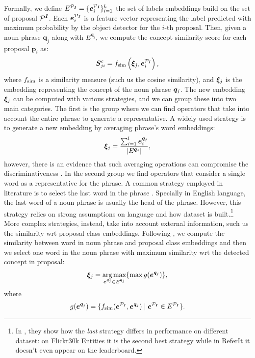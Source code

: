 Formally, we define $E^{\mathcal{P}_{\bm{I}}} = \{\bm{e}^{\mathcal{P}_{\bm{I}}}_i \}^{k}_{i=1}$ the set of labels
embeddings build on the set of proposal $\mathcal{P}^{\bm{I}}$. Each
$\bm{e}^{\mathcal{P}_{\bm{I}}}_i$ is a feature vector representing the label predicted with
maximum probability by the object detector for the $i$-th proposal.
Then, given a noun phrase $\bm{q}_j$ along with $E^{\bm{q}_j}$, we
compute the concept similarity score for each proposal $\bm{p}_i$ as:
\begin{equation}
  \bm{S}^c_{ji} = f_{\text{sim}} \left( \bm{\xi}_j, \bm{e}^{\mathcal{P}_{\bm{I}}}_i \right),
\end{equation}
where $f_{\text{sim}}$ is a similarity measure (such us the cosine similarity),
and $\bm{\xi}_j$ is the embedding representing the concept of the noun
phrase $\bm{q}_j$. The new embedding $\bm{\xi}_j$ can be computed with various
strategies, and we can group these into two main categories. The first
is the group where we can find operators that take into account the
entire phrase to generate a representative. A widely used strategy is
to generate a new embedding by averaging phrase's word embeddings:
\begin{equation}
  \bm{\xi}_j = \frac{\sum^l_{i=1} \bm{e}^{\bm{q}_j}_i}{| E^{\bm{q}_j} |},
\end{equation}
however, there is an evidence that such averaging operations can
compromise the discriminativeness
\cite{wang2019phrase,datta2019align2ground}. In the second group we
find operators that consider a single word as a representative for the
phrase. A common strategy employed in literature is to select the last
word in the phrase \cite{wang2019phrase}. Specially in English
language, the last word of a noun phrase is usually the head of the
phrase. However, this strategy relies on strong assumptions on
language and how dataset is built.\footnote{In \cite{wang2019phrase},
they show how the \textit{last} strategy differs in performance on
different dataset: on Flickr30k Entities it is the second best
strategy while in ReferIt it doesn't even appear on the leaderboard.}
More complex strategies, instead, take into account external
information, such us the similarity wrt proposal class embeddings.
Following \cite{wang2019phrase}, we compute the similarity between
word in noun phrase and proposal class embeddings and then we select
one word in the noun phrase with maximum similarity wrt the detected
concept in proposal:
\begin{equation}
  \bm{\xi}_j = \operatorname*{arg\,max}_{\bm{e}^{\bm{q}_j} \in E^{\bm{q}_j}} \{ \max g(\bm{e}^{\bm{q}_j}) \},
  \label{eq:concept-embedding-max-sim}
\end{equation}
where
\begin{equation}
  g(\bm{e}^{\bm{q}_j}) = \{ f_{\text{sim}}(\bm{e}^{\mathcal{P}_{\bm{I}}}, \bm{e}^{\bm{q}_j}) \mid \bm{e}^{\mathcal{P}_{\bm{I}}} \in E^{\mathcal{P}_{\bm{I}}} \}.
\end{equation}
